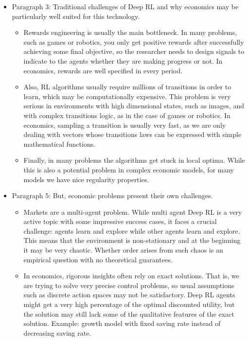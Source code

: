 \documentclass[11pt,english]{article}
\begin{document}
\begin{itemize}
	\item Paragraph 3: Traditional challenges of Deep RL and why economics may be particularly well suited for this technology.\medskip
	
	\begin{itemize}
		\item Rewards engineering is usually the main bottleneck. In many problems, such as games or robotics, you only get positive rewards after successfully achieving some final objective, so the researcher needs to design signals to indicate to the agents whether they are making progress or not. In economics, rewards are well specified in every period. \medskip
		
		\item Also, RL algorithms usually require millions of transitions in order to learn, which may be computationally expensive. This problem is very serious in environments with high dimensional states, such as images, and with complex transitions logic, as in the case of games or robotics. In economics, sampling a transition is usually very fast, as we are only dealing with vectors whose transitions laws can be expressed with simple mathematical functions. \medskip
		
		\item Finally, in many problems the algorithms get stuck in local optima. While this is also a potential problem in complex economic models, for many models we have nice regularity properties. \medskip
	\end{itemize}
	

	\item Paragraph 5: But, economic problems present their own challenges. \medskip
	
	\begin{itemize}
		\item Markets are a multi-agent problem. While multi agent Deep RL is a very active topic with some impressive success cases, it faces a crucial challenge: agents learn and explore while other agents learn and explore. This means that the environment is non-stationary and at the beginning it may be very chaotic. Whether order arises from such chaos is an empirical question with no theoretical guarantees. \medskip
		
		\item In economics, rigorous insights often rely on exact solutions. That is, we are trying to solve very precise control problems, so usual assumptions such as discrete action spaces may not be satisfactory. Deep RL agents might get a very high percentage of the optimal discounted utility, but the solution may still lack some of the qualitative features of the exact solution. Example: growth model with fixed saving rate instead of decreasing saving rate. \medskip
	\end{itemize}


\end{itemize}
\end{document}
